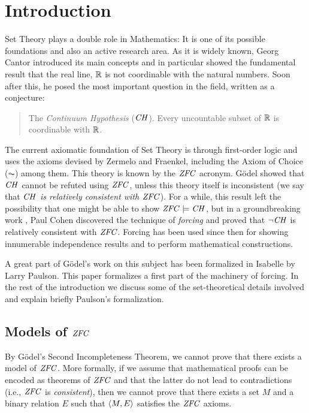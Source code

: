 \section{Introduction}\label{sec:introduction}
Set Theory plays a double role in Mathematics: It is one of its
possible foundations and also an active research area.
%
As it is widely known, Georg Cantor introduced its main concepts and in
particular showed the fundamental result that the real line, $\mathbb{R}$  is not
coordinable with the natural numbers. Soon after this, he posed the
most important question in the field, written as a conjecture:
\begin{quote}
  The \emph{Continuum Hypothesis} ($\mathit{CH}$). Every uncountable subset of $\mathbb{R}$ is
  coordinable with $\mathbb{R}$.
\end{quote}

The current axiomatic foundation of Set Theory is through first-order
logic and uses the axioms devised by Zermelo and Fraenkel, including
the Axiom of Choice ($\AC$) among them. This theory is known by the
$\mathit{ZFC}$ acronym. G\"odel \cite{godel-L} showed that $\mathit{CH}$ cannot be refuted using
$\mathit{ZFC}$, unless this theory itself is inconsistent (we say that
\emph{$\mathit{CH}$ is relatively consistent with $\mathit{ZFC}$}). For a while, this
result left the possibility that one might be able to show
$\mathit{ZFC}\models \mathit{CH}$, but in a groundbreaking work \cite{Cohen-CH-PNAS},
Paul Cohen discovered the technique of \emph{forcing} and proved that
$\neg\mathit{CH}$ is relatively consistent with $\mathit{ZFC}$. Forcing has been used
since then for showing innumerable independence results and to perform
mathematical constructions.

A great part of G\"odel's work on this subject has been formalized in
Isabelle by Larry Paulson. This paper formalizes a first part of the
machinery of forcing. In the rest of the introduction we discuss some
of the set-theoretical details involved and explain briefly Paulson's
formalization.

\subsection{Models of $\mathit{ZFC}$}
By G\"odel's Second Incompleteness Theorem, we cannot  prove that
there exists a model of $\mathit{ZFC}$. More formally, if we assume that
mathematical proofs can be encoded as theorems of $\mathit{ZFC}$ and that
the latter do not lead to contradictions (i.e., $\mathit{ZFC}$ is
\emph{consistent}), then we cannot prove that there exists a set $M$
and a binary relation $E$ such that $\langle M,E\rangle$ satisfies the $\mathit{ZFC}$
axioms.


